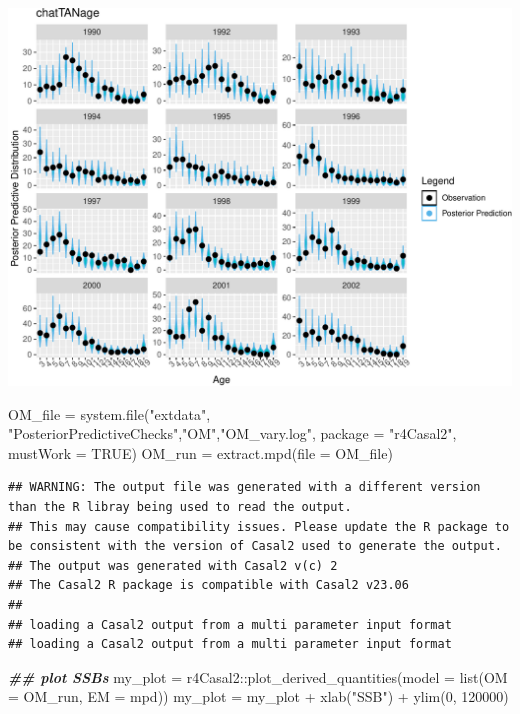\documentclass[
]{book}
\newenvironment{Shaded}{\begin{snugshade}}{\end{snugshade}}
\newcommand{\AttributeTok}[1]{\textcolor[rgb]{0.77,0.63,0.00}{#1}}
\newcommand{\ConstantTok}[1]{\textcolor[rgb]{0.00,0.00,0.00}{#1}}
\newcommand{\DecValTok}[1]{\textcolor[rgb]{0.00,0.00,0.81}{#1}}
\newcommand{\DocumentationTok}[1]{\textcolor[rgb]{0.56,0.35,0.01}{\textbf{\textit{#1}}}}
\newcommand{\FunctionTok}[1]{\textcolor[rgb]{0.00,0.00,0.00}{#1}}
\newcommand{\NormalTok}[1]{#1}
\newcommand{\OtherTok}[1]{\textcolor[rgb]{0.56,0.35,0.01}{#1}}
\newcommand{\SpecialCharTok}[1]{\textcolor[rgb]{0.00,0.00,0.00}{#1}}
\newcommand{\StringTok}[1]{\textcolor[rgb]{0.31,0.60,0.02}{#1}}
\begin{document}
\includegraphics{_main_files/figure-latex/ggplots_ppp-2.pdf}

\begin{Shaded}
\begin{Highlighting}[]
\NormalTok{OM\_file }\OtherTok{=} \FunctionTok{system.file}\NormalTok{(}\StringTok{"extdata"}\NormalTok{, }\StringTok{"PosteriorPredictiveChecks"}\NormalTok{,}\StringTok{"OM"}\NormalTok{,}\StringTok{"OM\_vary.log"}\NormalTok{, }\AttributeTok{package =} \StringTok{"r4Casal2"}\NormalTok{, }\AttributeTok{mustWork =} \ConstantTok{TRUE}\NormalTok{)}
\NormalTok{OM\_run }\OtherTok{=} \FunctionTok{extract.mpd}\NormalTok{(}\AttributeTok{file =}\NormalTok{ OM\_file)}
\end{Highlighting}
\end{Shaded}

\begin{verbatim}
## WARNING: The output file was generated with a different version than the R libray being used to read the output.
## This may cause compatibility issues. Please update the R package to be consistent with the version of Casal2 used to generate the output.
## The output was generated with Casal2 v(c) 2
## The Casal2 R package is compatible with Casal2 v23.06
## 
## loading a Casal2 output from a multi parameter input format
## loading a Casal2 output from a multi parameter input format
\end{verbatim}

\begin{Shaded}
\begin{Highlighting}[]
\DocumentationTok{\#\# plot SSBs}
\NormalTok{my\_plot }\OtherTok{=}\NormalTok{ r4Casal2}\SpecialCharTok{::}\FunctionTok{plot\_derived\_quantities}\NormalTok{(}\AttributeTok{model =} \FunctionTok{list}\NormalTok{(}\AttributeTok{OM =}\NormalTok{ OM\_run, }\AttributeTok{EM =}\NormalTok{ mpd))}
\NormalTok{my\_plot }\OtherTok{=}\NormalTok{ my\_plot }\SpecialCharTok{+} \FunctionTok{xlab}\NormalTok{(}\StringTok{"SSB"}\NormalTok{) }\SpecialCharTok{+} \FunctionTok{ylim}\NormalTok{(}\DecValTok{0}\NormalTok{, }\DecValTok{120000}\NormalTok{)}
\end{Highlighting}
\end{Shaded}
\end{document}
